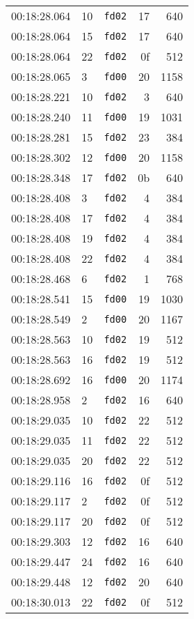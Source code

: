 \documentclass{article}
\begin{document}
\begin{longtable}{lllrr}
00:18:28.064 & 10 & \texttt{fd02} & 17 & 640 \\
00:18:28.064 & 15 & \texttt{fd02} & 17 & 640 \\
00:18:28.064 & 22 & \texttt{fd02} & 0f & 512 \\
00:18:28.065 & 3 & \texttt{fd00} & 20 & 1158 \\
00:18:28.221 & 10 & \texttt{fd02} & 3 & 640 \\
00:18:28.240 & 11 & \texttt{fd00} & 19 & 1031 \\
00:18:28.281 & 15 & \texttt{fd02} & 23 & 384 \\
00:18:28.302 & 12 & \texttt{fd00} & 20 & 1158 \\
00:18:28.348 & 17 & \texttt{fd02} & 0b & 640 \\
00:18:28.408 & 3 & \texttt{fd02} & 4 & 384 \\
00:18:28.408 & 17 & \texttt{fd02} & 4 & 384 \\
00:18:28.408 & 19 & \texttt{fd02} & 4 & 384 \\
00:18:28.408 & 22 & \texttt{fd02} & 4 & 384 \\
00:18:28.468 & 6 & \texttt{fd02} & 1 & 768 \\
00:18:28.541 & 15 & \texttt{fd00} & 19 & 1030 \\
00:18:28.549 & 2 & \texttt{fd00} & 20 & 1167 \\
00:18:28.563 & 10 & \texttt{fd02} & 19 & 512 \\
00:18:28.563 & 16 & \texttt{fd02} & 19 & 512 \\
00:18:28.692 & 16 & \texttt{fd00} & 20 & 1174 \\
00:18:28.958 & 2 & \texttt{fd02} & 16 & 640 \\
00:18:29.035 & 10 & \texttt{fd02} & 22 & 512 \\
00:18:29.035 & 11 & \texttt{fd02} & 22 & 512 \\
00:18:29.035 & 20 & \texttt{fd02} & 22 & 512 \\
00:18:29.116 & 16 & \texttt{fd02} & 0f & 512 \\
00:18:29.117 & 2 & \texttt{fd02} & 0f & 512 \\
00:18:29.117 & 20 & \texttt{fd02} & 0f & 512 \\
00:18:29.303 & 12 & \texttt{fd02} & 16 & 640 \\
00:18:29.447 & 24 & \texttt{fd02} & 16 & 640 \\
00:18:29.448 & 12 & \texttt{fd02} & 20 & 640 \\
00:18:30.013 & 22 & \texttt{fd02} & 0f & 512 \\

\end{longtable}
\end{document}
